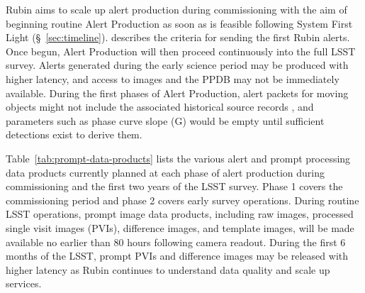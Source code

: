 Rubin aims to scale up alert production during commissioning with the aim of beginning routine Alert Production as soon as is feasible following System First Light  (\S~\ref{sec:timeline}).
 describes the criteria for sending the first Rubin alerts.
Once begun, Alert Production will then proceed continuously into the full LSST survey.
Alerts generated during the early science period may be produced with higher latency, and access to images and the PPDB may not be immediately available.
During the first phases of Alert Production, alert packets for moving objects might not include the associated historical source records , and parameters such as phase curve slope (G) would be empty until sufficient detections exist to derive them.

Table~\ref{tab:prompt-data-products} lists the various alert and prompt processing data products currently planned at each phase of alert production during commissioning and the first two years of the LSST survey. 
Phase 1 covers the commissioning period and phase 2 covers early survey operations.  
During routine LSST operations, prompt image data products, including  raw images, processed single visit images (PVIs), difference images, and template images, will be made available no earlier than 80 hours following camera readout. 
During the first 6 months of the LSST,  prompt PVIs and difference images may be released with higher latency as Rubin continues to understand data quality and scale up services.




